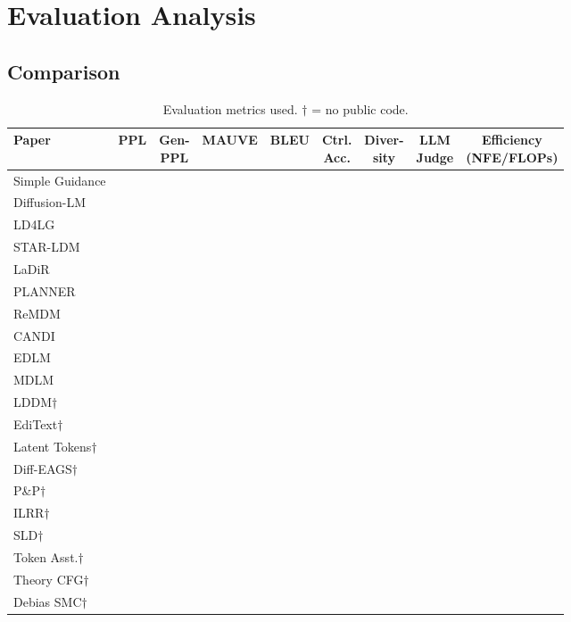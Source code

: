 \documentclass{article}
\newcommand{\gc}{\checkmark}
\begin{document}
\section{Evaluation Analysis}

\subsection{Comparison}

\begin{table}[h]
\centering
\footnotesize
\setlength{\tabcolsep}{2pt}
\begin{adjustbox}{max width=\textwidth}
\begin{tabular}{@{}lcccccccc@{}}
\toprule
\textbf{Paper} & \textbf{PPL} & \makecell{\textbf{Gen-}\\\textbf{PPL}} & \textbf{MAUVE} & \textbf{BLEU} & \makecell{\textbf{Ctrl.}\\\textbf{Acc.}} & \makecell{\textbf{Diver-}\\\textbf{sity}} & \makecell{\textbf{LLM}\\\textbf{Judge}} & \makecell{\textbf{Efficiency}\\\textbf{(NFE/FLOPs)}} \\
\midrule
Simple Guidance & \gc & & & & \gc & & & \\
Diffusion-LM & & \gc & & \gc & \gc & \gc & & \\
LD4LG & \gc & \gc & \gc & \gc & & \gc & & \\
STAR-LDM & & & & & \gc & & \gc & \\
LaDiR & & & & & \gc & \gc & & \\
PLANNER & & \gc & & \gc & & \gc & & \\
ReMDM & \gc & \gc & \gc & & & \gc & & \gc \\
CANDI & \gc & & & & & & & \\
EDLM & \gc & \gc & & & & \gc & & \\
MDLM & \gc & \gc & & & & & & \\
\midrule
LDDM$\dagger$ & \gc & & & & & & & \\
EdiText$\dagger$ & & & & & \gc & & & \\
Latent Tokens$\dagger$ & \gc & & & & & & & \\
Diff-EAGS$\dagger$ & & & & \gc & \gc & \gc & & \gc \\
P\&P$\dagger$ & & & & & \gc & & & \\
ILRR$\dagger$ & & & & & \gc & & & \\
SLD$\dagger$ & & & & \gc & & & \gc & \\
Token Asst.$\dagger$ & & & & & \gc & & & \gc \\
Theory CFG$\dagger$ & & & \gc & & \gc & & & \\
Debias SMC$\dagger$ & & & & & \gc & & & \\
\bottomrule
\end{tabular}
\end{adjustbox}
\caption{Evaluation metrics used. $\dagger$ = no public code.}
\end{table}
\end{document}
